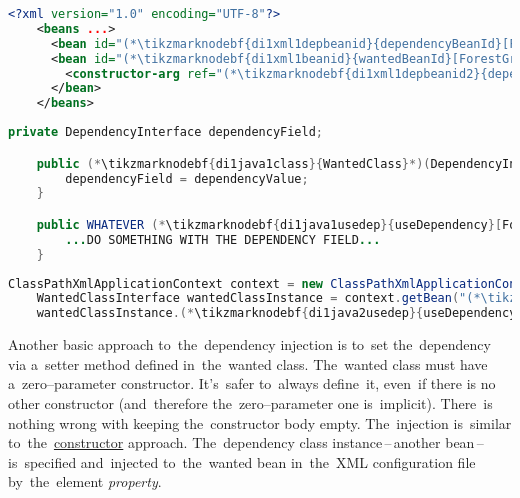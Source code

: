 \example
\begin{lstlisting}[language=XML, title={Configuration XML}]
    <?xml version="1.0" encoding="UTF-8"?>
    <beans ...>
      <bean id="(*\tikzmarknodebf{di1xml1depbeanid}{dependencyBeanId}[ForestGreen]*)" class="package.subfolder.DependencyClass"/>
      <bean id="(*\tikzmarknodebf{di1xml1beanid}{wantedBeanId}[ForestGreen]*)" class="package.subfolder.(*\tikzmarknodebf{di1xml1class}{WantedClass}[ForestGreen]*)">
        <constructor-arg ref="(*\tikzmarknodebf{di1xml1depbeanid2}{dependencyBeanId}[ForestGreen]*)"/>
      </bean>
    </beans>
\end{lstlisting}
\begin{lstlisting}[language=Java, title={Wanted class with the constructor}]
    private DependencyInterface dependencyField;

    public (*\tikzmarknodebf{di1java1class}{WantedClass}*)(DependencyInterface dependencyValue) {
        dependencyField = dependencyValue;
    }

    public WHATEVER (*\tikzmarknodebf{di1java1usedep}{useDependency}[ForestGreen]*)() {
        ...DO SOMETHING WITH THE DEPENDENCY FIELD...
    }
\end{lstlisting}
\begin{lstlisting}[language=Java, title={Usage}]
    ClassPathXmlApplicationContext context = new ClassPathXmlApplicationContext("configurationFile.xml");
    WantedClassInterface wantedClassInstance = context.getBean("(*\tikzmarknodebf{di1java2beanid}{wantedBeanId}[ForestGreen]*)", WantedClassInterface.class);
    wantedClassInstance.(*\tikzmarknodebf{di1java2usedep}{useDependency}*)();
\end{lstlisting}

\newpage
{}
\label{setterinjection}
Another basic approach to~the~dependency injection is to~set the~dependency via a~setter method defined in~the~wanted class. The~wanted class must have a~zero--parameter constructor. It's~safer to~always define~it, even~if there is no other constructor (and~therefore the~zero--parameter one is~implicit). There~is nothing wrong with keeping the~constructor body empty. The~injection is~similar to~the~\hyperref[constructorinjection]{constructor} approach. The~dependency class instance\,--\,another bean\,--\, is~specified and~injected to~the~wanted bean in~the~XML configuration file by~the~element \textit{property}.

